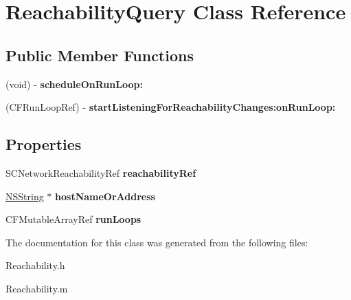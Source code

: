 \hypertarget{interface_reachability_query}{
\section{ReachabilityQuery Class Reference}
\label{interface_reachability_query}
}
\subsection*{Public Member Functions}
\begin{DoxyCompactItemize}
\item 
\hypertarget{interface_reachability_query_a4beafe59623ae5618264054ed971f74b}{
(void) -\/ {\bfseries scheduleOnRunLoop:}}
\label{interface_reachability_query_a4beafe59623ae5618264054ed971f74b}

\item 
\hypertarget{interface_reachability_query_a9c97b2aa8f2a16857f947d2ba7dde985}{
(CFRunLoopRef) -\/ {\bfseries startListeningForReachabilityChanges:onRunLoop:}}
\label{interface_reachability_query_a9c97b2aa8f2a16857f947d2ba7dde985}

\end{DoxyCompactItemize}
\subsection*{Properties}
\begin{DoxyCompactItemize}
\item 
\hypertarget{interface_reachability_query_a2b9ccb5e6783849ac346740d17304a28}{
SCNetworkReachabilityRef {\bfseries reachabilityRef}}
\label{interface_reachability_query_a2b9ccb5e6783849ac346740d17304a28}

\item 
\hypertarget{interface_reachability_query_add3630415071b553a9de75edd986cc10}{
\hyperlink{class_n_s_string}{NSString} $\ast$ {\bfseries hostNameOrAddress}}
\label{interface_reachability_query_add3630415071b553a9de75edd986cc10}

\item 
\hypertarget{interface_reachability_query_a5f52aaa4afece4d726f734a712265fc1}{
CFMutableArrayRef {\bfseries runLoops}}
\label{interface_reachability_query_a5f52aaa4afece4d726f734a712265fc1}

\end{DoxyCompactItemize}


The documentation for this class was generated from the following files:\begin{DoxyCompactItemize}
\item 
Reachability.h\item 
Reachability.m\end{DoxyCompactItemize}
